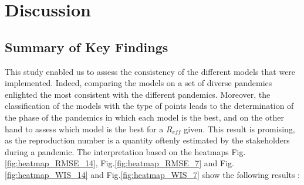 \section{Discussion}



\subsection{Summary of Key Findings}

This study enabled us to assess the consistency of the different models that were implemented. 
Indeed, comparing the models on a set of diverse pandemics enlighted the most consistent with the different pandemics.
Moreover, the classification of the models with the type of points leads to the determination of the phase of the pandemics in which each model is the best, and on the other hand to assess which model is the best for a $R_{eff}$ given. 
This result is promising, as the reproduction number is a quantity oftenly estimated by the stakeholders during a pandemic. 
The interpretation based on the heatmaps Fig.\ref{fig:heatmap_RMSE_14}, Fig.\ref{fig:heatmap_RMSE_7} and Fig.\ref{fig:heatmap_WIS_14} and Fig.\ref{fig:heatmap_WIS_7} show the following results : \\



